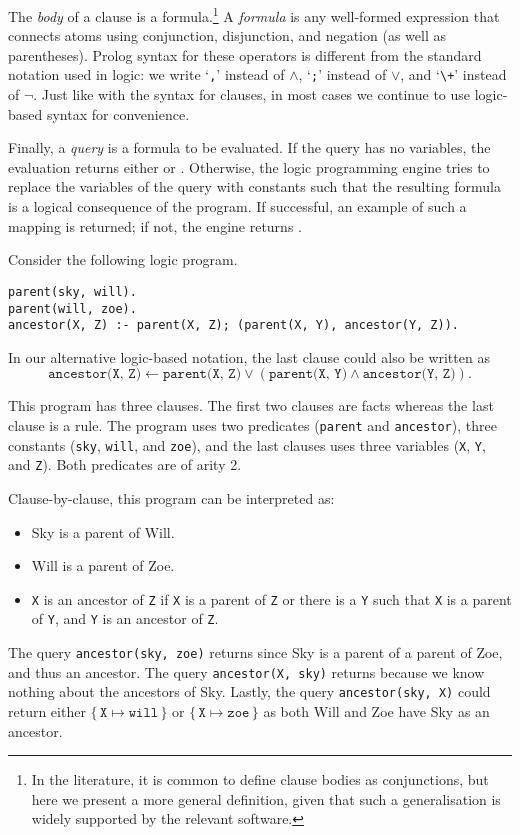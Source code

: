 The \emph{body} of a clause is a formula.\footnote{In the literature, it is
  common to define clause bodies as conjunctions, but here we present a more
  general definition, given that such a generalisation is widely supported by
  the relevant software.} A \emph{formula} is any well-formed expression that
connects atoms using conjunction, disjunction, and negation (as well as
parentheses). Prolog syntax for these operators is different from the standard
notation used in logic: we write `\verb+,+' instead of $\land$, `\verb+;+'
instead of $\lor$, and `\verb#\+#' instead of $\neg$. Just like with the syntax
for clauses, in most cases we continue to use logic-based syntax for
convenience.

Finally, a \emph{query} is a formula to be evaluated. If the query has no
variables, the evaluation returns either \true{} or \false{}. Otherwise, the
logic programming engine tries to replace the variables of the query with
constants such that the resulting formula is a logical consequence of the
program. If successful, an example of such a mapping is returned; if not, the
engine returns \false{}.

\begin{example}
  Consider the following logic program.
\begin{verbatim}
parent(sky, will).
parent(will, zoe).
ancestor(X, Z) :- parent(X, Z); (parent(X, Y), ancestor(Y, Z)).
\end{verbatim}
  In our alternative logic-based notation, the last clause could also be written
  as
  \[
    \texttt{ancestor(X, Z)} \gets \texttt{parent(X, Z)} \lor (\texttt{parent(X, Y)} \land \texttt{ancestor(Y, Z)}).
  \]

  This program has three clauses. The first two clauses are facts whereas the
  last clause is a rule. The program uses two predicates (\texttt{parent} and
  \texttt{ancestor}), three constants (\texttt{sky}, \texttt{will}, and
  \texttt{zoe}), and the last clauses uses three variables (\texttt{X},
  \texttt{Y}, and \texttt{Z}). Both predicates are of arity 2.

  Clause-by-clause, this program can be interpreted as:
  \begin{itemize}
    \item Sky is a parent of Will.
    \item Will is a parent of Zoe.
    \item \texttt{X} is an ancestor of \texttt{Z} if \texttt{X} is a parent of
          \texttt{Z} or there is a \texttt{Y} such that \texttt{X} is a parent
          of \texttt{Y}, and \texttt{Y} is an ancestor of \texttt{Z}.
  \end{itemize}

  The query \texttt{ancestor(sky, zoe)} returns \true{} since Sky is a parent of
  a parent of Zoe, and thus an ancestor. The query \texttt{ancestor(X, sky)}
  returns \false{} because we know nothing about the ancestors of Sky. Lastly,
  the query \texttt{ancestor(sky, X)} could return either
  $\{\, \texttt{X} \mapsto \texttt{will} \,\}$ or
  $\{\, \texttt{X} \mapsto \texttt{zoe} \,\}$ as both Will and Zoe have Sky as
  an ancestor.
\end{example}

